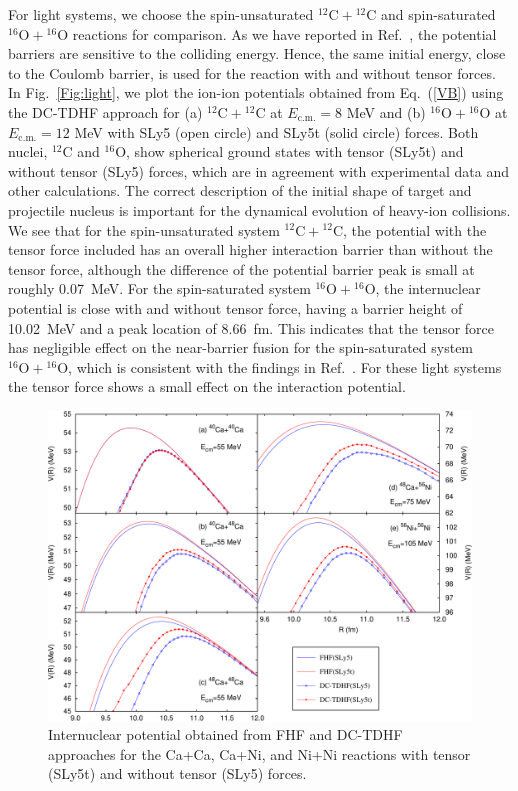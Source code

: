 For light systems, we choose the spin-unsaturated $^{12}\mathrm{C}+\mathrm{^{12}C}$ and spin-saturated $^{16}\mathrm{O}+\mathrm{^{16}O}$ reactions
for comparison. As we have reported in Ref.~\citep{Umar2014_PRC89-034611}, the potential barriers are sensitive to the
colliding energy. Hence, the same initial energy, close to the Coulomb barrier, is used for the reaction with and without tensor forces.
In Fig.~\ref{Fig:light}, we plot the ion-ion potentials obtained from Eq.~(\ref{VB}) using the DC-TDHF approach for (a) $^{12}\mathrm{C}+\mathrm{^{12}C}$
at $E_{\mathrm{c.m.}}=8$ MeV  and (b) $^{16}\mathrm{O}+\mathrm{^{16}O}$ at $E_{\mathrm{c.m.}}=12$ MeV with SLy5 (open circle) and SLy5t (solid circle) forces.
Both nuclei, $^{12}\mathrm{C}$ and $\mathrm{^{16}O}$, show spherical ground states with tensor (SLy5t) and without tensor (SLy5) forces, which
are in agreement with experimental data and other calculations. The correct description of the initial shape of
target and projectile nucleus is important for the dynamical evolution of heavy-ion collisions.
We see that for the spin-unsaturated system $^{12}\mathrm{C}+\mathrm{^{12}C}$, the potential with the tensor force included has an overall higher
interaction barrier than without the tensor force, although the difference of the potential barrier peak is small at roughly 0.07~MeV.
For the spin-saturated system $^{16}\mathrm{O}+\mathrm{^{16}O}$, the internuclear potential is close with and without tensor force,
having a barrier height of 10.02~MeV and a peak location of 8.66~fm. This indicates that the tensor force has negligible effect on the near-barrier fusion
for the spin-saturated system $^{16}\mathrm{O}+\mathrm{^{16}O}$, which is consistent with the findings in Ref.~\citep{Stevenson2016_PRC93-054617}.
For these light systems the tensor force shows a small effect on the interaction potential.
\begin{figure}
	\includegraphics[width=\textwidth]{../Figures/TensorPot/V3_ppt.pdf}
	\caption{Internuclear potential obtained from FHF and DC-TDHF approaches for the Ca+Ca, Ca+Ni, and Ni+Ni reactions
		with tensor (SLy5t) and without tensor (SLy5) forces.
		\label{Fig:medium}}
\end{figure}

